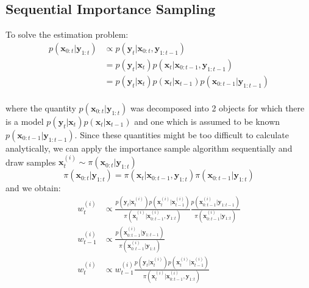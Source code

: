 \documentclass[
]{article}
\begin{document}
\hypertarget{sequential-importance-sampling}{%
\subsection{Sequential Importance
Sampling}\label{sequential-importance-sampling}}

To solve the estimation problem: \[
\begin{equation*}
    \begin{aligned}
        p(\textbf{x}_{0:t}|\textbf{y}_{1:t}) &\propto p(\textbf{y}_{t}|\textbf{x}_{0:t},\textbf{y}_{1:t-1}) \\
                                             &= p(\textbf{y}_{t}|\textbf{x}_{t})p(\textbf{x}_{t}|\textbf{x}_{0:t-1}, \textbf{y}_{1:t-1}) \\
                                             &= p(\textbf{y}_{t}|\textbf{x}_{t})p(\textbf{x}_{t}|\textbf{x}_{t-1}) p(\textbf{x}_{0:t-1}|\textbf{y}_{1:t-1}) \\
    \end{aligned}
\end{equation*}
\]

where the quantity \(p(\textbf{x}_{0:t}|\textbf{y}_{1:t})\) was
decomposed into 2 objects for which there is a model
\(p(\textbf{y}_{t}|\textbf{x}_{t})p(\textbf{x}_{t}|\textbf{x}_{t-1})\)
and one which is assumed to be known
\(p(\textbf{x}_{0:t-1}|\textbf{y}_{1:t-1})\). Since these quantities
might be too difficult to calculate analytically, we can apply the
importance sample algorithm sequentially and draw samples
\(\textbf{x}_t^{(i)} \sim \pi(\textbf{x}_{0:t}|\textbf{y}_{1:t})\) \[
\begin{equation*}
    \pi(\textbf{x}_{0:t}|\textbf{y}_{1:t}) = \pi(\textbf{x}_{t}|\textbf{x}_{0:t-1},\textbf{y}_{1:t})\pi(\textbf{x}_{0:t-1}|\textbf{y}_{1:t})
\end{equation*}
\] and we obtain: \[
\begin{equation*}
    \begin{aligned}
        w_t^{(i)} &\propto \frac{p(\textbf{y}_{t}|\textbf{x}_{t}^{(i)})p(\textbf{x}_{t}^{(i)}|\textbf{x}_{t-1}^{(i)}) }{\pi(\textbf{x}_{t}^{(i)}|\textbf{x}_{0:t-1}^{(i)},\textbf{y}_{1:t})} \frac{p(\textbf{x}_{0:t-1}^{(i)}|\textbf{y}_{1:t-1})}{\pi(\textbf{x}_{0:t-1}^{(i)}|\textbf{y}_{1:t})} \\
        w_{t-1}^{(i)} &\propto \frac{p(\textbf{x}_{0:t-1}^{(i)}|\textbf{y}_{1:t-1})}{\pi(\textbf{x}_{0:t-1}^{(i)}|\textbf{y}_{1:t})} \\
        w_t^{(i)} &\propto  w_{t-1}^{(i)} \frac{p(\textbf{y}_{t}|\textbf{x}_{t}^{(i)})p(\textbf{x}_{t}^{(i)}|\textbf{x}_{t-1}^{(i)}) }{\pi(\textbf{x}_{t}^{(i)}|\textbf{x}_{0:t-1}^{(i)},\textbf{y}_{1:t})}
    \end{aligned}
\end{equation*}
\]
\end{document}

